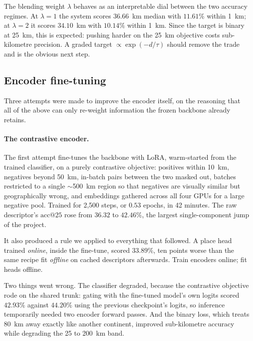 \documentclass[11pt,a4paper]{article}
\begin{document}
The blending weight $\lambda$ behaves as an interpretable dial between the two accuracy
regimes. At $\lambda = 1$ the system scores $36.66$~km median with $11.61\%$ within 1~km; at
$\lambda = 2$ it scores $34.10$~km with $10.14\%$ within 1~km. Since the target is binary at
25~km, this is expected: pushing harder on the 25~km objective costs sub-kilometre precision.
A graded target $\propto \exp(-d/\tau)$ should remove the trade and is the obvious next step.

\subsection{Encoder fine-tuning}
\label{sec:encoders}

Three attempts were made to improve the encoder itself, on the reasoning that all of the
above can only re-weight information the frozen backbone already retains.

\paragraph{The contrastive encoder.}
The first attempt fine-tunes the backbone with LoRA, warm-started from the trained
classifier, on a purely contrastive objective: positives within 10~km, negatives beyond
50~km, in-batch pairs between the two masked out, batches restricted to a single
$\sim$500~km region so that negatives are visually similar but geographically wrong, and
embeddings gathered across all four GPUs for a large negative pool. Trained for 2{,}500
steps, or $0.53$ epochs, in 42 minutes. The raw descriptor's $\mathrm{acc@}25$ rose from
$36.32$ to $42.46\%$, the largest single-component jump of the project.

It also produced a rule we applied to everything that followed. A place head trained
\emph{online}, inside the fine-tune, scored $33.89\%$, ten points worse than the same recipe
fit \emph{offline} on cached descriptors afterwards. Train encoders online; fit heads offline.

Two things went wrong. The classifier degraded, because the contrastive objective rode on the
shared trunk: gating with the fine-tuned model's own logits scored $42.93\%$ against
$44.20\%$ using the previous checkpoint's logits, so inference temporarily needed two encoder
forward passes. And the binary loss, which treats 80~km away exactly like another continent,
improved sub-kilometre accuracy while degrading the 25 to 200~km band.
\end{document}
